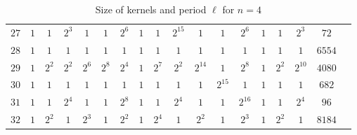 \begin{table}
\begin{center}
\begin{adjustbox}{max width=\textwidth}
\begin{tabular}{|c|cccccccccccccccc|c|}
$27$ &$1$ &$1$ &$2^3$ &$1$ &$1$ &$2^6$ &$1$ &$1$ &$2^{15}$ &$1$ &$1$ &$2^6$ &$1$ &$1$ &$2^3$ &$72$ \\
$28$ &$1$ &$1$ &$1$ &$1$ &$1$ &$1$ &$1$ &$1$ &$1$ &$1$ &$1$ &$1$ &$1$ &$1$ &$1$ &$6554$ \\
$29$ &$1$ &$2^2$ &$2^2$ &$2^6$ &$2^8$ &$2^4$ &$1$ &$2^7$ &$2^2$ &$2^{14}$ &$1$ &$2^8$ &$1$ &$2^2$ &$2^{10}$ &$4080$ \\
$30$ &$1$ &$1$ &$1$ &$1$ &$1$ &$1$ &$1$ &$1$ &$1$ &$1$ &$2^{15}$ &$1$ &$1$ &$1$ &$1$ &$682$ \\
$31$ &$1$ &$1$ &$2^4$ &$1$ &$1$ &$2^8$ &$1$ &$1$ &$2^4$ &$1$ &$1$ &$2^{16}$ &$1$ &$1$ &$2^4$ &$96$ \\
$32$ &$1$ &$2^2$ &$1$ &$2^3$ &$1$ &$2^2$ &$1$ &$2^4$ &$1$ &$2^2$ &$1$ &$2^3$ &$1$ &$2^2$ &$1$ &$8184$ \\

      \hline
      \hline
    \end{tabular}
    \end{adjustbox}
  \end{center}
  \caption{Size of kernels and period $\ell$ for $n=4$}
\end{table}

